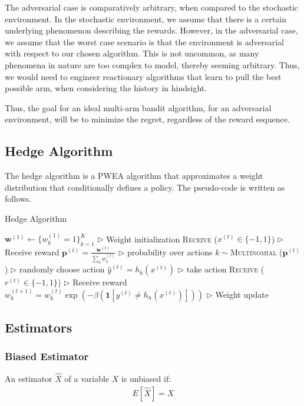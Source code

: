 \documentclass[11pt]{article}
\begin{document}
The adversarial case is comparatively arbitrary, when compared to the stochastic environment. In the stochastic environment, we assume that there is a certain underlying phenomenon describing the rewards. However, in the adversarial case, we assume that the worst case scenario is that the environment is adversarial with respect to our chosen algorithm. This is not uncommon, as many phenomena in nature are too complex to model, thereby seeming arbitrary. Thus, we would need to engineer reactionary algorithms that learn to pull the best possible arm, when considering the history in hindsight.

Thus, the goal for an ideal multi-arm bandit algorithm, for an adversarial environment, will be to minimize the regret, regardless of the reward sequence. 

\subsection{Hedge Algorithm}
The hedge algorithm is a PWEA algorithm that approximates a weight distribution that conditionally defines a policy. The pseudo-code is written as follows.

\begin{algorithm}[H]
\caption{Hedge Algorithm}
\label{algo:Hedge}
\begin{algorithmic}[1]
\STATE $\textbf{w}^{(1)} \leftarrow \{w_k^{(1)}=1\}_{k=1}^K$ \hfill $\triangleright$ Weight initialization
\STATE \textsc{Receive} ($x^{(t)}\in\{-1, 1\}$) \hfill $\triangleright$ Receive reward
\STATE $\textbf{p}^{(t)}=\frac{\textbf{w}^{(t)}}{\sum_kw_k^{(t)}}$ \hfill $\triangleright$ probability over actions
\STATE $k \sim$\textsc{Multinomial} ($\textbf{p}^{(t)}$) \hfill $\triangleright$ randomly choose action
\STATE $\hat{y}^{(t)} = h_k(x^{(t)})$ \hfill $\triangleright$ take action
\STATE \textsc{Receive} ($r^{(t)}\in\{-1, 1\}$) \hfill $\triangleright$ Receive reward
\STATE $w_k^{(t+1)} = w_k^{(t)} \exp \left(-\beta \left( \mathbf{1}\left[y^{(t)} \neq h_{n}\left(x^{(t)}\right)\right] \right) \right)$ \hfill $\triangleright$ Weight update
\ENDFOR
\end{algorithmic}
\end{algorithm}
\subsection{Estimators}
\subsubsection{Biased Estimator}
An estimator $\hat{X}$ of a variable $X$ is unbiased if:
\begin{align}
  E\left[\hat{X}\right] = X
\end{align}
\end{document}
